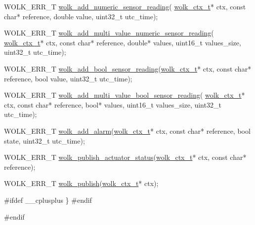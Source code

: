 \begin{DoxyCodeInclude}
WOLK\_ERR\_T \hyperlink{wolk__connector_8h_ab7bcc53c7c06a6cc2b8db5190b1af70f}{wolk\_add\_numeric\_sensor\_reading}(
      \hyperlink{structwolk__ctx}{wolk\_ctx\_t}* ctx, \textcolor{keyword}{const} \textcolor{keywordtype}{char}* reference, \textcolor{keywordtype}{double} value, uint32\_t utc\_time);

WOLK\_ERR\_T \hyperlink{wolk__connector_8h_a27582cf8777d4a8c5f4e8a7aae4c71e0}{wolk\_add\_multi\_value\_numeric\_sensor\_reading}(
      \hyperlink{structwolk__ctx}{wolk\_ctx\_t}* ctx, \textcolor{keyword}{const} \textcolor{keywordtype}{char}* reference, \textcolor{keywordtype}{double}* values,
                                                       uint16\_t values\_size, uint32\_t utc\_time);

WOLK\_ERR\_T \hyperlink{wolk__connector_8h_ad1bb3cf88c78d7aa9669c4118e654849}{wolk\_add\_bool\_sensor\_reading}(\hyperlink{structwolk__ctx}{wolk\_ctx\_t}* ctx, \textcolor{keyword}{const} \textcolor{keywordtype}{char}* 
      reference, \textcolor{keywordtype}{bool} value, uint32\_t utc\_time);

WOLK\_ERR\_T \hyperlink{wolk__connector_8h_a8d365d03f444eb3284615a138f30f1fa}{wolk\_add\_multi\_value\_bool\_sensor\_reading}(
      \hyperlink{structwolk__ctx}{wolk\_ctx\_t}* ctx, \textcolor{keyword}{const} \textcolor{keywordtype}{char}* reference, \textcolor{keywordtype}{bool}* values,
                                                    uint16\_t values\_size, uint32\_t utc\_time);

WOLK\_ERR\_T \hyperlink{wolk__connector_8h_aec965973c23d360dc158d8ef6d037e54}{wolk\_add\_alarm}(\hyperlink{structwolk__ctx}{wolk\_ctx\_t}* ctx, \textcolor{keyword}{const} \textcolor{keywordtype}{char}* reference, \textcolor{keywordtype}{bool} state, 
      uint32\_t utc\_time);

WOLK\_ERR\_T \hyperlink{wolk__connector_8h_aa510c9f8df1d095d4e1aef9b7fdaf600}{wolk\_publish\_actuator\_status}(\hyperlink{structwolk__ctx}{wolk\_ctx\_t}* ctx, \textcolor{keyword}{const} \textcolor{keywordtype}{char}* 
      reference);

WOLK\_ERR\_T \hyperlink{wolk__connector_8h_ac5e7ddb346ea4b9a7cc4511d3728be09}{wolk\_publish}(\hyperlink{structwolk__ctx}{wolk\_ctx\_t}* ctx);

\textcolor{preprocessor}{#ifdef \_\_cplusplus}
\}
\textcolor{preprocessor}{#endif}

\textcolor{preprocessor}{#endif}
\end{DoxyCodeInclude}
 